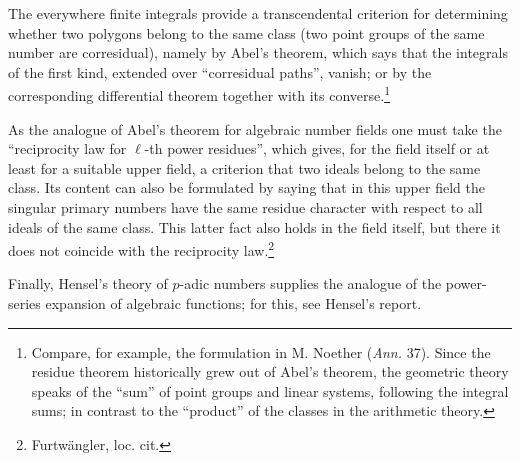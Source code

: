 \documentclass[11pt]{article}
\begin{document}
The everywhere finite integrals provide a transcendental criterion for determining whether two polygons belong to the same class (two point groups of the same number are corresidual), namely by Abel's theorem, which says that the integrals of the first kind, extended over ``corresidual paths'', vanish; or by the corresponding differential theorem together with its converse.\footnote{Compare, for example, the formulation in M. Noether (\emph{Ann.} 37). Since the residue theorem historically grew out of Abel's theorem, the geometric theory speaks of the ``sum'' of point groups and linear systems, following the integral sums; in contrast to the ``product'' of the classes in the arithmetic theory.}

As the analogue of Abel's theorem for algebraic number fields one must take the ``reciprocity law for \(\ell\)-th power residues'', which gives, for the field itself or at least for a suitable upper field, a criterion that two ideals belong to the same class. Its content can also be formulated by saying that in this upper field the singular primary numbers have the same residue character with respect to all ideals of the same class. This latter fact also holds in the field itself, but there it does not coincide with the reciprocity law.\footnote{Furtwängler, loc. cit.}

Finally, Hensel's theory of \(p\)-adic numbers supplies the analogue of the power-series expansion of algebraic functions; for this, see Hensel's report.
\end{document}
